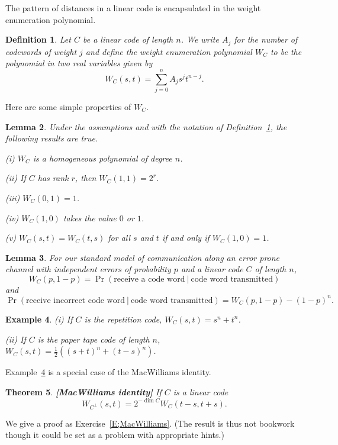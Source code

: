 \documentclass[12pt,a4paper]{article}
\theoremstyle{plain}
\newtheorem{theorem}{Theorem}[section]
\newtheorem{lemma}[theorem]{Lemma}
\newtheorem{definition}[theorem]{Definition}
\newtheorem{example}[theorem]{Example}
\theoremstyle{definition}
\begin{document}
    The pattern of distances in a linear code
    is encapsulated in the
    weight enumeration polynomial.
    \begin{definition}
        \label{enumeration}
        Let $C$ be a linear code of length $n$.
        We write $A_{j}$ for the number of codewords
        of weight $j$ and define the
        \emph{weight enumeration polynomial} $W_{C}$
        to be the polynomial in two real variables
        given by
        \[W_{C}(s,t)=\sum_{j=0}^{n}A_{j}s^{j}t^{n-j}.\]
    \end{definition}
    Here are some simple properties of $W_{C}$.
    \begin{lemma}
        Under the assumptions and
        with the notation of Definition~\ref{enumeration},
        the following results are true.

        (i) $W_{C}$ is a homogeneous polynomial of degree $n$.

        (ii)  If $C$ has rank $r$, then $W_{C}(1,1)=2^{r}$.

        (iii) $W_{C}(0,1)=1$.

        (iv) $W_{C}(1,0)$ takes the value $0$ or $1$.

        (v)  $W_{C}(s,t)=W_{C}(t,s)$ for all $s$ and $t$
        if and only if $W_{C}(1,0)=1$.
    \end{lemma}
    \begin{lemma}
        For our standard model of communication
        along an error prone channel with independent errors
        of probability $p$ and a linear code $C$ of length $n$,
        \[W_{C}(p,1-p)=\Pr(\text{receive a code word}\ |
        \ \text{code word transmitted})\]
        and
        \[\Pr(\text{receive incorrect code word}\ |
        \ \text{code word transmitted})=W_{C}(p,1-p)-(1-p)^{n}.\]
    \end{lemma}
    \begin{example}
        \label{Example William}
        (i) If $C$ is the repetition code,
        $W_{C}(s,t)=s^{n}+t^{n}$.

        (ii) If $C$ is the paper tape code of length $n$,
        $W_{C}(s,t)=\frac{1}{2}((s+t)^{n}+(t-s)^{n})$.
    \end{example}

    Example~\ref{Example William} is a special case of the
    MacWilliams identity.
    \begin{theorem}{\bf [MacWilliams identity]}
        If $C$ is a linear
        code
        \[W_{C^{\perp}}(s,t)=2^{-\dim C}W_{C}(t-s,t+s).\]
    \end{theorem}
    \noindent
    We give a proof as Exercise~\ref{E;MacWilliams}.
    (The result is thus not bookwork though it
    could be set as a problem with appropriate hints.)
\end{document}

